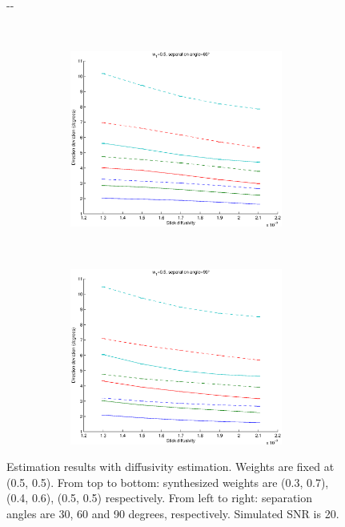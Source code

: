 \documentclass{article}
\begin{document}
\begin{figure}[H]
\begin{adjustwidth}{-\oddsidemargin}{-\rightmargin}
\begin{subfigure}{0.8\paperwidth}
\begin{subfigure}{0.3\textwidth}
      \end{subfigure}
      ~
      \begin{subfigure}{0.3\textwidth}
        \centering
        \includegraphics[width=\textwidth]{figures/synth_modbas_diffus__snr=20__w1=5__angle=60.eps}
      \end{subfigure}
      ~
      \begin{subfigure}{0.3\textwidth}
        \centering
        \includegraphics[width=\textwidth]{figures/synth_modbas_diffus__snr=20__w1=5__angle=90.eps}
      \end{subfigure}
    \end{subfigure}
  \end{adjustwidth}
  
  \caption{Estimation results with diffusivity estimation. Weights are fixed at (0.5, 0.5). From top to bottom: synthesized weights are (0.3, 0.7), (0.4, 0.6), (0.5, 0.5) respectively. From left to right: separation angles are 30, 60 and 90 degrees, respectively. Simulated SNR is 20.}
\end{figure}
\end{document}
